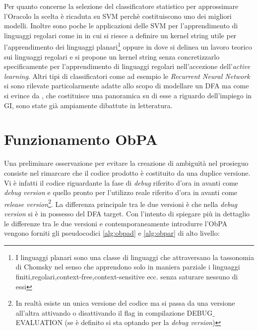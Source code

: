 Per quanto concerne la selezione del classificatore statistico per approssimare l'Oracolo la scelta è ricaduta su \ac{SVM} perchè costituiscono uno dei migliori modelli. Inoltre sono poche le applicazioni delle \ac{SVM} per l'apprendimento di linguaggi regolari come in \cite{Clark11}\cite{Clark06}  in cui si riesce a definire un kernel string utile per l'apprendimento dei linguaggi planari\footnote{I linguaggi planari sono una classe di linguaggi che attraversano la tassonomia di Chomsky nel senso che apprendono solo in maniera parziale i linguaggi finiti,regolari,context-free,context-sensitive ecc. senza saturare nessuno di essi}  oppure in \cite{Kontorovich09} dove si delinea un lavoro teorico sui linguaggi regolari e si propone un kernel string senza concretizzarlo specificamente per l'apprendimento di linguaggi regolari nell'accezione dell'\textit{active learning}. Altri tipi di classificatori come ad esempio le \textit{Recurrent Neural Network} si sono rilevate particolarmente adatte allo scopo di modellare un \ac{DFA} ma come si evince da \cite{Forcada02}, che costituisce una panoramica su di esse a riguardo dell'impiego in  \ac{GI}, sono state già ampiamente dibattute in letteratura.

\section{Funzionamento ObPA}
Una preliminare osservazione per evitare la creazione di ambiguità nel prosieguo consiste nel rimarcare che il codice prodotto è costituito da una duplice versione. Vi è infatti il codice riguardante la fase di \textit{debug} riferito d'ora in avanti come \textit{debug version} e quello pronto per l'utilizzo reale riferito d'ora in avanti come \textit{release version}\footnote{In realtà esiste un unica versione del codice ma si passa da una versione all'altra attivando o disattivando il flag in compilazione DEBUG$\_$EVALUATION (se è definito si sta optando per la \textit{debug version})}. La differenza principale tra le due versioni è che nella \textit{debug version} si è in possesso del \ac{DFA} target. Con l'intento di spiegare più in dettaglio le differenze tra le due versioni e contemporaneamente introdurre l'\ac{ObPA} vengono forniti gli pseudocodici \ref{alg:obpad} e \ref{alg:obpar} di alto livello:

